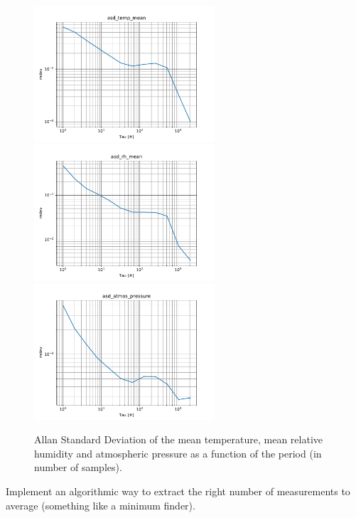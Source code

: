 \documentclass[11pt]{amsart}
\begin{document}
\begin{figure}
\includegraphics[width=0.6\textwidth]{../plots/asd_temp_mean.pdf}
\includegraphics[width=0.6\textwidth]{../plots/asd_rh_mean.pdf}
\includegraphics[width=0.6\textwidth]{../plots/asd_atmos_pressure.pdf}
\caption{Allan Standard Deviation of the mean temperature, mean relative humidity and atmospheric pressure as a function of the period (in number of samples).}
\end{figure}

{\tgf Implement an algorithmic way to extract the right number of measurements to average (something like a minimum finder).}
\end{document}
